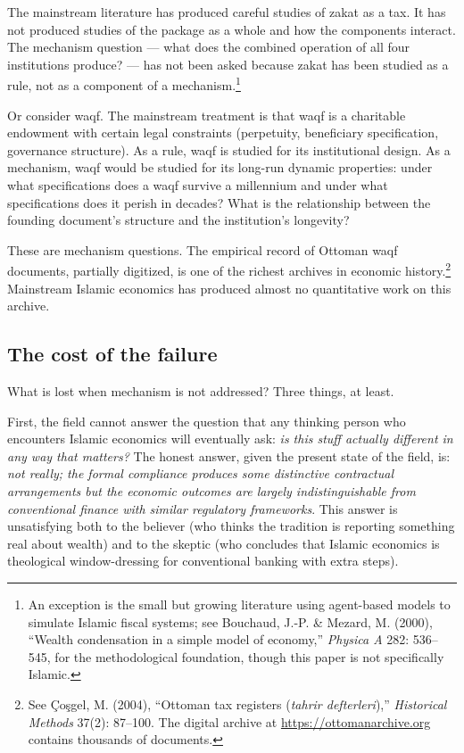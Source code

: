 The mainstream literature has produced careful studies of zakat as a
tax. It has not produced studies of the package as a whole and how
the components interact. The mechanism question --- what does the
combined operation of all four institutions produce? --- has not
been asked because zakat has been studied as a rule, not as a
component of a mechanism.\footnote{An exception is the small but
growing literature using agent-based models to simulate Islamic
fiscal systems; see Bouchaud, J.-P. \& Mezard, M. (2000), ``Wealth
condensation in a simple model of economy,'' \emph{Physica A} 282:
536--545, for the methodological foundation, though this paper is
not specifically Islamic.}

Or consider waqf. The mainstream treatment is that waqf is a
charitable endowment with certain legal constraints (perpetuity,
beneficiary specification, governance structure). As a rule, waqf is
studied for its institutional design. As a mechanism, waqf would be
studied for its long-run dynamic properties: under what
specifications does a waqf survive a millennium and under what
specifications does it perish in decades? What is the relationship
between the founding document's structure and the institution's
longevity?

These are mechanism questions. The empirical record of Ottoman waqf
documents, partially digitized, is one of the richest archives in
economic history.\footnote{See \c{C}o\c{s}gel, M. (2004), ``Ottoman
tax registers (\textit{tahrir defterleri}),'' \emph{Historical Methods}
37(2): 87--100. The digital archive at
\url{https://ottomanarchive.org} contains thousands of documents.}
Mainstream Islamic economics has produced almost no quantitative work
on this archive.

\subsection{The cost of the failure}

What is lost when mechanism is not addressed? Three things, at
least.

First, the field cannot answer the question that any thinking
person who encounters Islamic economics will eventually ask: \emph{is
this stuff actually different in any way that matters?} The honest
answer, given the present state of the field, is: \emph{not really;
the formal compliance produces some distinctive contractual
arrangements but the economic outcomes are largely
indistinguishable from conventional finance with similar regulatory
frameworks}. This answer is unsatisfying both to the believer (who
thinks the tradition is reporting something real about wealth) and
to the skeptic (who concludes that Islamic economics is theological
window-dressing for conventional banking with extra steps).

